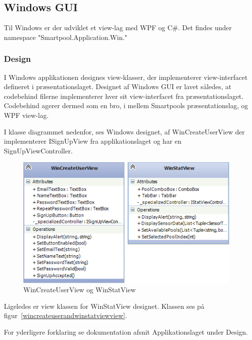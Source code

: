 \subsection{Windows GUI}
Til Windows er der udviklet et view-lag med WPF og C\#. Det findes under namespace "Smartpool.Application.Win."

\subsubsection{Design}
I Windows applikationen designes view-klasser, der implementerer view-interfacet defineret i præsentationslaget.
Designet af Windows GUI er lavet således, at codebehind filerne implementerer hver sit view-interfacet fra præsentationslaget. Codebehind agerer dermed som en bro, i mellem Smartpools præsentationslag, og WPF view-lag.

I klasse diagrammet nedenfor, ses Windows designet, af WinCreateUserView der implementerer ISignUpView fra applikationslaget og har en SignUpViewController.
\begin{figure}
	\centering
	\includegraphics[width=0.7\linewidth]{figs/design/wincreateuserandwinstatviewview}
	\caption{WinCreateUserView og WinStatView}
	\label{fig:wincreateuserandwinstatviewview}
\end{figure}

Ligeledes er view klassen for WinStatView designet.
Klassen ses på figur~\ref{wincreateuserandwinstatviewview}.

For yderligere forklaring se dokumentation afsnit Applikationslaget under Design.